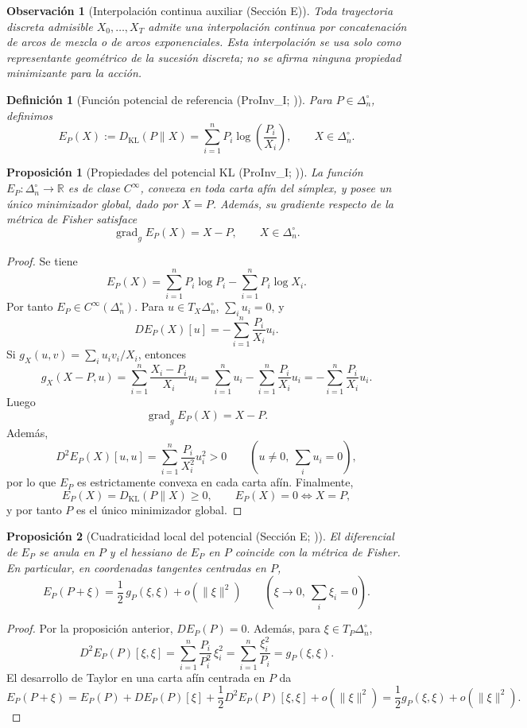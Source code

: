 ﻿\documentclass[12pt]{article}
\newcommand{\fuente}[1]{\textnormal{(#1)}}
\newcommand{\fuentecite}[2]{\textnormal{(#1; \citealp{#2})}}
\newtheorem{definicion}{Definición}[section]
\newtheorem{proposicion}{Proposición}[section]
\newtheorem{observacion}{Observación}[section]
\begin{document}
\begin{observacion}[Interpolación continua auxiliar \fuente{Sección E}]
Toda trayectoria discreta admisible \(X_0,\dots,X_T\) admite una interpolación continua por concatenación de arcos de mezcla o de arcos exponenciales. Esta interpolación se usa solo como representante geométrico de la sucesión discreta; no se afirma ninguna propiedad minimizante para la acción.
\end{observacion}

\begin{definicion}[Función potencial de referencia \fuentecite{ProInv\_I}{ControlInformacional2026}]
Para \(P\in\Delta_n^\circ\), definimos
\[
E_P(X):=D_{\mathrm{KL}}(P\|X)
=\sum_{i=1}^n P_i\log\!\left(\frac{P_i}{X_i}\right),
\qquad X\in\Delta_n^\circ.
\]
\end{definicion}

\begin{proposicion}[Propiedades del potencial KL \fuentecite{ProInv\_I}{ControlInformacional2026}]
La función \(E_P:\Delta_n^\circ\to\mathbb R\) es de clase \(C^\infty\), convexa en toda carta afín del símplex, y posee un único minimizador global, dado por \(X=P\). Además, su gradiente respecto de la métrica de Fisher satisface
\[
\operatorname{grad}_g E_P(X)=X-P,
\qquad X\in\Delta_n^\circ.
\]
\end{proposicion}
\begin{proof}
Se tiene
\[
E_P(X)=\sum_{i=1}^n P_i\log P_i-\sum_{i=1}^n P_i\log X_i.
\]
Por tanto \(E_P\in C^\infty(\Delta_n^\circ)\). Para \(u\in T_X\Delta_n^\circ\), \(\sum_i u_i=0\), y
\[
DE_P(X)[u]=-\sum_{i=1}^n \frac{P_i}{X_i}u_i.
\]
Si \(g_X(u,v)=\sum_i u_iv_i/X_i\), entonces
\[
g_X(X-P,u)=\sum_{i=1}^n \frac{X_i-P_i}{X_i}u_i
=\sum_{i=1}^n u_i-\sum_{i=1}^n \frac{P_i}{X_i}u_i
=-\sum_{i=1}^n \frac{P_i}{X_i}u_i.
\]
Luego
\[
\operatorname{grad}_g E_P(X)=X-P.
\]
Además,
\[
D^2E_P(X)[u,u]=\sum_{i=1}^n \frac{P_i}{X_i^2}u_i^2>0
\qquad(u\neq 0,\ \sum_i u_i=0),
\]
por lo que \(E_P\) es estrictamente convexa en cada carta afín. Finalmente,
\[
E_P(X)=D_{\mathrm{KL}}(P\|X)\ge 0,
\qquad
E_P(X)=0\iff X=P,
\]
y por tanto \(P\) es el único minimizador global.
\end{proof}

\begin{proposicion}[Cuadraticidad local del potencial \fuentecite{Sección E}{ControlInformacional2026}]
El diferencial de \(E_P\) se anula en \(P\) y el hessiano de \(E_P\) en \(P\) coincide con la métrica de Fisher. En particular, en coordenadas tangentes centradas en \(P\),
\[
E_P(P+\xi)=\frac12\,g_P(\xi,\xi)+o(\|\xi\|^2)
\qquad (\xi\to 0,\ \sum_i \xi_i=0).
\]
\end{proposicion}
\begin{proof}
Por la proposición anterior, \(DE_P(P)=0\). Además, para \(\xi\in T_P\Delta_n^\circ\),
\[
D^2E_P(P)[\xi,\xi]
=\sum_{i=1}^n \frac{P_i}{P_i^2}\,\xi_i^2
=\sum_{i=1}^n \frac{\xi_i^2}{P_i}
=g_P(\xi,\xi).
\]
El desarrollo de Taylor en una carta afín centrada en \(P\) da
\[
E_P(P+\xi)
=E_P(P)+DE_P(P)[\xi]+\frac12 D^2E_P(P)[\xi,\xi]+o(\|\xi\|^2)
=\frac12 g_P(\xi,\xi)+o(\|\xi\|^2).
\]
\end{proof}
\end{document}
